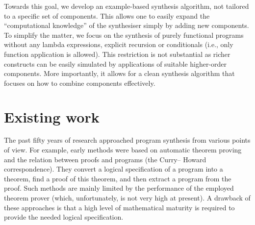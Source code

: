 Towards this goal, we develop an example-based synthesis algorithm, not tailored to a specific set of components.  This allows one to easily expand the ``computational knowledge'' of the synthesiser simply by adding new components.  To simplify the matter, we focus on the synthesis of purely functional programs without any lambda expressions, explicit recursion or conditionals (i.e., only function application is allowed).  This restriction is not substantial as richer constructs can be easily simulated by applications of suitable higher-order components.  More importantly, it allows for a clean synthesis algorithm that focuses on how to combine components effectively.


\section{Existing work}\label{Background}
The past fifty years of research approached program synthesis from various points of view.  For example, early methods \cite{Manna:1980:DAP:357084.357090} were based on automatic theorem proving and the relation between proofs and programs (the Curry– Howard correspondence).  They convert a logical specification of a program into a theorem, find a proof of this theorem, and then extract a program from the proof.  Such methods are mainly limited by the performance of the employed theorem prover (which, unfortunately, is not very high at present).  A drawback of these approaches is that a high level of mathematical maturity is required to provide the needed logical specification.

